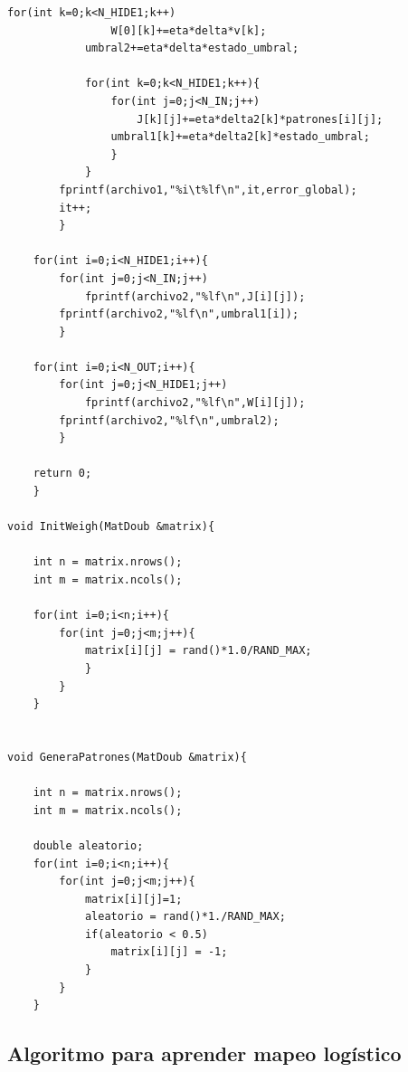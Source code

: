 \documentclass[aps,prb,onecolumn,10pt,floatfix,superscriptaddress]{article} %
\begin{document}
\begin{lstlisting}[frame=single,breaklines=true]
			for(int k=0;k<N_HIDE1;k++)
				W[0][k]+=eta*delta*v[k];	
			umbral2+=eta*delta*estado_umbral;	

			for(int k=0;k<N_HIDE1;k++){
				for(int j=0;j<N_IN;j++)
					J[k][j]+=eta*delta2[k]*patrones[i][j];
				umbral1[k]+=eta*delta2[k]*estado_umbral;
				}
			}
		fprintf(archivo1,"%i\t%lf\n",it,error_global);
		it++;
		}
		
	for(int i=0;i<N_HIDE1;i++){
		for(int j=0;j<N_IN;j++)
			fprintf(archivo2,"%lf\n",J[i][j]);
		fprintf(archivo2,"%lf\n",umbral1[i]);
		}
	
	for(int i=0;i<N_OUT;i++){
		for(int j=0;j<N_HIDE1;j++)
			fprintf(archivo2,"%lf\n",W[i][j]);
		fprintf(archivo2,"%lf\n",umbral2);
		}
		
	return 0;
	}

void InitWeigh(MatDoub &matrix){
	
	int n = matrix.nrows();
	int m = matrix.ncols();
	
	for(int i=0;i<n;i++){
		for(int j=0;j<m;j++){
			matrix[i][j] = rand()*1.0/RAND_MAX;
			}
		}
	}

		
void GeneraPatrones(MatDoub &matrix){
	
	int n = matrix.nrows();
	int m = matrix.ncols();
	
	double aleatorio;
	for(int i=0;i<n;i++){
		for(int j=0;j<m;j++){
			matrix[i][j]=1;
			aleatorio = rand()*1./RAND_MAX;
			if(aleatorio < 0.5)
				matrix[i][j] = -1;
			}
		}
	}
\end{lstlisting}

\subsection{Algoritmo para aprender mapeo log\'istico}
\end{document}
